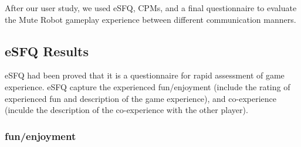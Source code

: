 


After our user study, we used eSFQ, CPMs, and a final questionnaire to evaluate the Mute Robot gameplay experience between different communication manners.

\subsection{eSFQ Results}
eSFQ\cite{eSFQ} had been proved that it is a questionnaire for rapid assessment of game experience. eSFQ capture the experienced fun/enjoyment (include the rating of experienced fun and description of the game experience), and co-experience (inculde the description of the co-experience with the other player). 



\subsubsection{fun/enjoyment}



